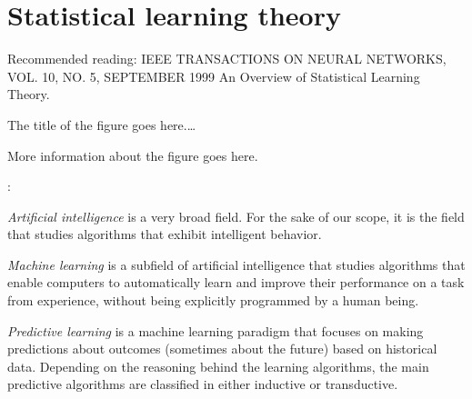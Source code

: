 \chapter{Statistical learning theory}



Recommended reading: IEEE TRANSACTIONS ON NEURAL NETWORKS, VOL. 10, NO. 5, SEPTEMBER 1999
An Overview of Statistical Learning Theory.

\begin{figurebox}[label=fig:learning]{The title of the figure goes here.\dots}
  \centering
  \tcblower
  More information about the figure goes here.
\end{figurebox}

:

\emph{Artificial intelligence} is a very broad field.  For the sake of our scope, it is
the field that studies algorithms that exhibit intelligent behavior.

\emph{Machine learning} is a subfield of artificial intelligence that studies algorithms
that enable computers to automatically learn and improve their performance on a task from
experience, without being explicitly programmed by a human being.

\emph{Predictive learning} is a machine learning paradigm that focuses on making
predictions about outcomes (sometimes about the future) based on historical data.
Depending on the reasoning behind the learning algorithms, the main predictive algorithms
are classified in either inductive or transductive.

